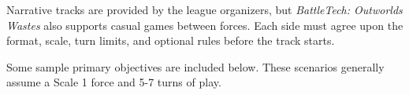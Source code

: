 Narrative tracks are provided by the league organizers, but \emph{BattleTech: Outworlds Wastes} also supports casual games between forces.
Each side must agree upon the format, scale, turn limits, and optional rules before the track starts.

Some sample primary objectives are included below.
These scenarios generally assume a Scale 1 force and 5-7 turns of play.
